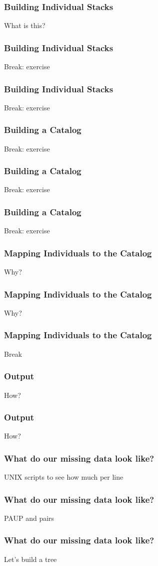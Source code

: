 \documentclass{beamer}
\begin{document}
\begin{frame}
\frametitle{Building Individual Stacks}
What is this?
\end{frame}

\begin{frame}
\frametitle{Building Individual Stacks}
Break: exercise
\end{frame}

\begin{frame}
\frametitle{Building Individual Stacks}
Break: exercise
\end{frame}

\begin{frame}
\frametitle{Building a Catalog}
Break: exercise
\end{frame}

\begin{frame}
\frametitle{Building a Catalog}
Break: exercise
\end{frame}

\begin{frame}
\frametitle{Building a Catalog}
Break: exercise
\end{frame}

\begin{frame}
\frametitle{Mapping Individuals to the Catalog}
Why?
\end{frame}

\begin{frame}
\frametitle{Mapping Individuals to the Catalog}
Why?
\end{frame}

\begin{frame}
\frametitle{Mapping Individuals to the Catalog}
Break
\end{frame}

\begin{frame}
\frametitle{Output}
How?
\end{frame}

\begin{frame}
\frametitle{Output}
How?
\end{frame}

\begin{frame}
\frametitle{What do our missing data look like?}
UNIX scripts to see how much per line
\end{frame}

\begin{frame}
\frametitle{What do our missing data look like?}
PAUP and pairs
\end{frame}

\begin{frame}
\frametitle{What do our missing data look like?}
Let's build a tree
\end{frame}
\end{document}
